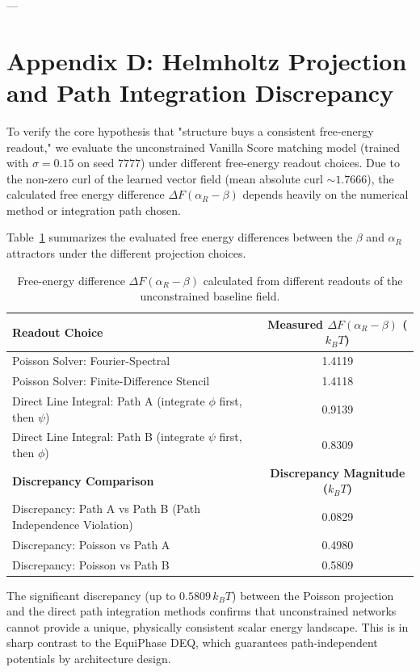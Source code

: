 ---

\section{Appendix D: Helmholtz Projection and Path Integration Discrepancy}
\label{sec:appendix_d}

To verify the core hypothesis that "structure buys a consistent free-energy readout," we evaluate the unconstrained Vanilla Score matching model (trained with $\sigma=0.15$ on seed $7777$) under different free-energy readout choices. Due to the non-zero curl of the learned vector field (mean absolute curl $\sim 1.7666$), the calculated free energy difference $\Delta F(\alpha_R - \beta)$ depends heavily on the numerical method or integration path chosen.

Table~\ref{tab:helmholtz_discrepancy} summarizes the evaluated free energy differences between the $\beta$ and $\alpha_R$ attractors under the different projection choices.

\begin{table}[h]
\centering
\caption{Free-energy difference $\Delta F(\alpha_R - \beta)$ calculated from different readouts of the unconstrained baseline field.}
\label{tab:helmholtz_discrepancy}
\begin{tabular}{lc}
\hline
\textbf{Readout Choice} & \textbf{Measured $\Delta F(\alpha_R - \beta)$ ($k_B T$)} \\ \hline
Poisson Solver: Fourier-Spectral & 1.4119 \\
Poisson Solver: Finite-Difference Stencil & 1.4118 \\
Direct Line Integral: Path A (integrate $\phi$ first, then $\psi$) & 0.9139 \\
Direct Line Integral: Path B (integrate $\psi$ first, then $\phi$) & 0.8309 \\ \hline
\textbf{Discrepancy Comparison} & \textbf{Discrepancy Magnitude ($k_B T$)} \\ \hline
Discrepancy: Path A vs Path B (Path Independence Violation) & 0.0829 \\
Discrepancy: Poisson vs Path A & 0.4980 \\
Discrepancy: Poisson vs Path B & 0.5809 \\ \hline
\end{tabular}
\end{table}

The significant discrepancy (up to $0.5809\,k_B T$) between the Poisson projection and the direct path integration methods confirms that unconstrained networks cannot provide a unique, physically consistent scalar energy landscape. This is in sharp contrast to the EquiPhase DEQ, which guarantees path-independent potentials by architecture design.
